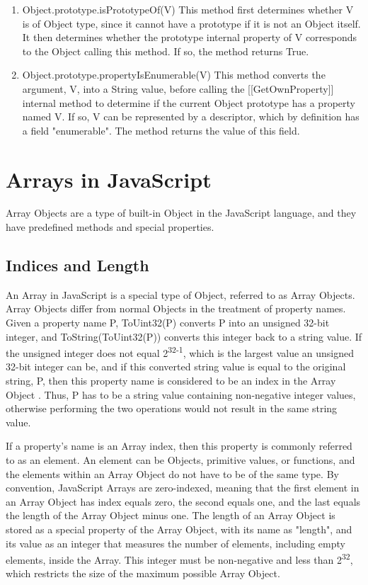 \documentclass[a4paper,11pt,twoside]{report}
\begin{document}
\begin{enumerate}
\item Object.prototype.isPrototypeOf(V) \newline
This method first determines whether V is of Object type, since it cannot have a prototype if it is not an Object itself. It then determines whether the prototype internal property of V corresponds to the Object calling this method. If so, the method returns True.

\item Object.prototype.propertyIsEnumerable(V) \newline
This method converts the argument, V, into a String value, before calling the [[GetOwnProperty]] internal method to determine if the current Object prototype has a property named V. If so, V can be represented by a descriptor, which by definition has a field "enumerable". The method returns the value of this field.
\end{enumerate}

\chapter{Arrays in JavaScript}
Array Objects are a type of built-in Object in the JavaScript language, and they have predefined methods and special properties. 

\section{Indices and Length}
An Array in JavaScript is a special type of Object, referred to as Array Objects. Array Objects differ from normal Objects in the treatment of property names. Given a property name P, ToUint32(P) converts P into an unsigned 32-bit integer, and ToString(ToUint32(P)) converts this integer back to a string value. If the unsigned integer does not equal 2\textsuperscript{32-1}, which is the largest value an unsigned 32-bit integer can be, and if this converted string value is equal to the original string, P, then this property name is considered to be an index in the Array Object \cite{EcmaScript}. Thus, P has to be a string value containing non-negative integer values, otherwise performing the two operations would not result in the same string value. 

If a property's name is an Array index, then this property is commonly referred to as an element. An element can be Objects, primitive values, or functions, and the elements within an Array Object do not have to be of the same type. By convention, JavaScript Arrays are zero-indexed, meaning that the first element in an Array Object has index equals zero, the second equals one, and the last equals the length of the Array Object minus one. The length of an Array Object is stored as a special property of the Array Object, with its name as "length", and its value as an integer that measures the number of elements, including empty elements, inside the Array. This integer must be non-negative and less than 2\textsuperscript{32}, which restricts the size of the maximum possible Array Object. 
\end{document}
